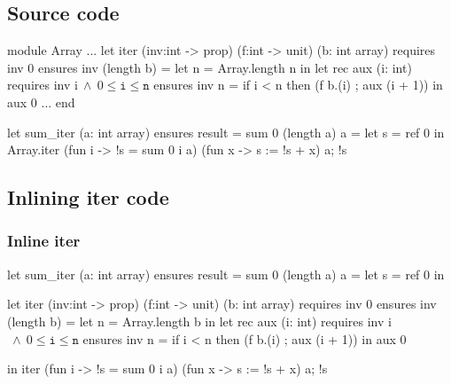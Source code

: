 \documentclass[xcolor=dvipsnames]{beamer}
\newcommand{\OliveGreen}[1]{\textcolor{OliveGreen}{#1}}
\newcommand{\bwedge}{\boldsymbol{~\wedge~}}
\begin{document}
\subsection*{Source code}
\begin{frame}[fragile]
\vspace*{0em}
\begin{footnotesize}
\begin{whycode} 
module Array 
... 
   let iter (inv:int -> prop) (f:int -> unit) (b: int array)
   requires { inv 0 } 
   ensures  { inv (length b) } 
   = let n = Array.length n in
     let rec aux (i: int)
     requires { inv i$\bwedge 0 \leq \texttt{i} \leq \texttt{n}$ }
     ensures  { inv n }
     = if i < n
       then (f b.(i) ; aux (i + 1)) 
     in aux 0
...
end

let sum_iter (a: int array) 
ensures { result = sum 0 (length a) a }
= let s = ref 0 in
  Array.iter 
    (fun i -> !s = sum 0 i a) (fun x -> s := !s + x) a; 
  !s
\end{whycode} 
\end{footnotesize}
\end{frame}
\addtocounter{framenumber}{-1}

\subsection*{Inlining iter code}
\begin{frame}[fragile]
\frametitle{\OliveGreen{Inline iter}}
\vspace*{0em}
\begin{footnotesize}
\begin{whygray}
let sum_iter (a: int array) 
ensures { result = sum 0 (length a) a }
= let s = ref 0 in 
\end{whygray}\vspace*{-1.15em} 
\begin{whycode}
  let iter (inv:int -> prop) (f:int -> unit) (b: int array)
  requires { inv 0 } 
  ensures  { inv (length b) } 
  = let n = Array.length b in
    let rec aux (i: int)
    requires { inv i$\bwedge 0 \leq \texttt{i} \leq \texttt{n}$ }
    ensures  { inv n }
    = if i < n
      then (f b.(i) ; aux (i + 1)) 
    in aux 0 \end{whycode} \vspace*{-1.15em} 
 \begin{whygray}
  in iter (fun i -> !s = sum 0 i a) (fun x -> s := !s + x) a; 
  !s
\end{whygray}
\end{footnotesize}
\end{frame}
\addtocounter{framenumber}{-1}
\end{document}
